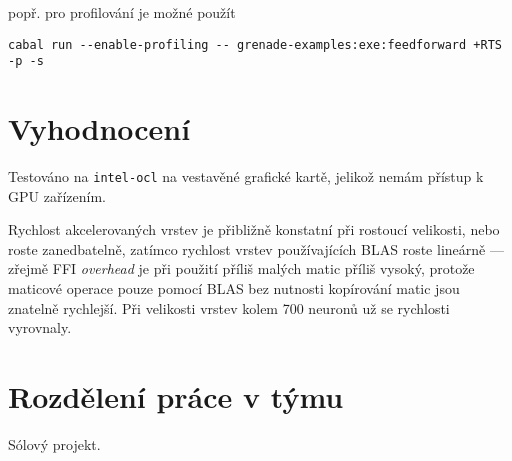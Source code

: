 \documentclass[11pt,a4paper]{article}
\begin{document}
popř. pro profilování je možné použít

\begin{verbatim}
cabal run --enable-profiling -- grenade-examples:exe:feedforward +RTS -p -s
\end{verbatim}

\section{Vyhodnocení}

Testováno na \texttt{intel-ocl} na vestavěné grafické kartě, jelikož nemám
přístup k GPU zařízením.

Rychlost akcelerovaných vrstev je přibližně konstatní při rostoucí velikosti,
nebo roste zanedbatelně, zatímco rychlost vrstev používajících BLAS roste
lineárně --- zřejmě FFI \textit{overhead} je při použití příliš malých matic
příliš vysoký, protože maticové operace pouze pomocí BLAS bez nutnosti
kopírování matic jsou znatelně rychlejší. Při velikosti vrstev kolem 700 neuronů
už se rychlosti vyrovnaly.

\section{Rozdělení práce v týmu}

Sólový projekt.
\end{document}
